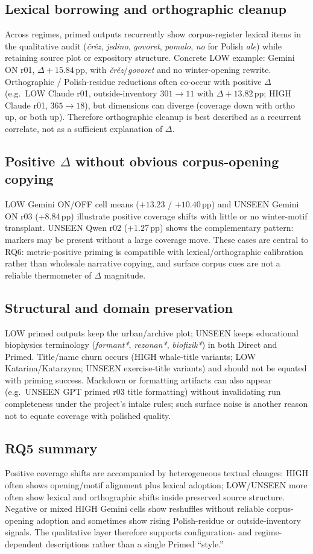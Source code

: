 \subsection{Lexical borrowing and orthographic cleanup}
Across regimes, primed outputs recurrently show corpus-register lexical items in the qualitative audit (\emph{\v{c}r\v{e}z}, \emph{jedino}, \emph{govoret}, \emph{pomalo}, \emph{no} for Polish \emph{ale}) while retaining source plot or expository structure.
Concrete LOW example: Gemini ON r01, $\Delta +15.84$\,pp, with \emph{\v{c}r\v{e}z}/\emph{govoret} and no winter-opening rewrite.
Orthographic / Polish-residue reductions often co-occur with positive $\Delta$ (e.g.\ LOW Claude r01, outside-inventory $301\rightarrow 11$ with $\Delta +13.82$\,pp; HIGH Claude r01, $365\rightarrow 18$), but dimensions can diverge (coverage down with ortho up, or both up).
Therefore orthographic cleanup is best described as a recurrent correlate, not as a sufficient explanation of $\Delta$.

\subsection{Positive $\Delta$ without obvious corpus-opening copying}
LOW Gemini ON/OFF cell means ($+13.23$ / $+10.40$\,pp) and UNSEEN Gemini ON r03 ($+8.84$\,pp) illustrate positive coverage shifts with little or no winter-motif transplant.
UNSEEN Qwen r02 ($+1.27$\,pp) shows the complementary pattern: markers may be present without a large coverage move.
These cases are central to RQ6: metric-positive priming is compatible with lexical/orthographic calibration rather than wholesale narrative copying, and surface corpus cues are not a reliable thermometer of $\Delta$ magnitude.

\subsection{Structural and domain preservation}
LOW primed outputs keep the urban/archive plot; UNSEEN keeps educational biophysics terminology (\emph{formant*}, \emph{rezonan*}, \emph{biofizik*}) in both Direct and Primed.
Title/name churn occurs (HIGH whale-title variants; LOW Katarina/Katarzyna; UNSEEN exercise-title variants) and should not be equated with priming success.
Markdown or formatting artifacts can also appear (e.g.\ UNSEEN GPT primed r03 title formatting) without invalidating run completeness under the project's intake rules; such surface noise is another reason not to equate coverage with polished quality.

\subsection{RQ5 summary}
Positive coverage shifts are accompanied by heterogeneous textual changes: HIGH often shows opening/motif alignment plus lexical adoption; LOW/UNSEEN more often show lexical and orthographic shifts inside preserved source structure.
Negative or mixed HIGH Gemini cells show reshuffles without reliable corpus-opening adoption and sometimes show rising Polish-residue or outside-inventory signals.
The qualitative layer therefore supports configuration- and regime-dependent descriptions rather than a single Primed ``style.''

